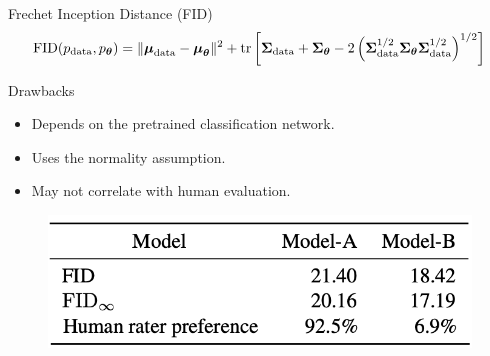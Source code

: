 \documentclass{beamer}
\begin{document}
\begin{frame}{Frechet Inception Distance (FID)}
	\vspace{-0.4cm}
	\[
		\mathrm{FID} (p_{\text{data}}, p_{\boldsymbol{\theta}}) = \| \boldsymbol{\mu}_{\text{data}} - \boldsymbol{\mu}_{\boldsymbol{\theta}}\|^2 + \text{tr} \left[ \boldsymbol{\Sigma}_{\text{data}} + \boldsymbol{\Sigma}_{\boldsymbol{\theta}} - 2 \left(\boldsymbol{\Sigma}_{\text{data}}^{1/2} \boldsymbol{\Sigma}_{\boldsymbol{\theta}} \boldsymbol{\Sigma}_{\text{data}}^{1/2} \right)^{1/2} \right]
	\]
	\eqpause
	\vspace{-0.3cm}
	\begin{block}{Drawbacks}
		\begin{itemize}
			\item Depends on the pretrained classification network.
			\item Uses the normality assumption.
			\item May not correlate with human evaluation.
		\end{itemize}
	\end{block}
	\eqpause
	\begin{figure}
		\includegraphics[width=0.7\linewidth]{figs/fid_vs_human_eval}
	\end{figure}
\end{frame}
\end{document}
